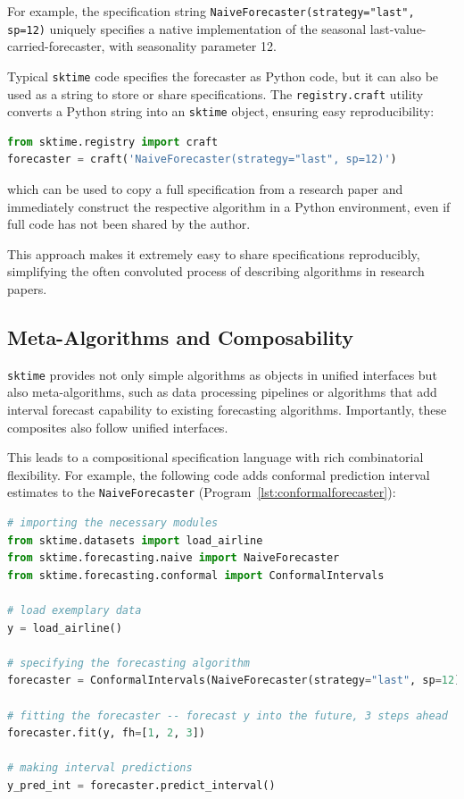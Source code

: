 For example, the specification string
\texttt{NaiveForecaster(strategy="last", sp=12)}
uniquely specifies a native implementation of the seasonal last-value-carried-forecaster, with seasonality parameter 12.

Typical \texttt{sktime} code specifies the forecaster as Python code, but it can also be used as a string to store or share specifications. The \texttt{registry.craft} utility converts a Python string into an \texttt{sktime} object, ensuring easy reproducibility:

\begin{lstlisting}[language=Python, caption=Code to craft a forecaster from a string]
from sktime.registry import craft
forecaster = craft('NaiveForecaster(strategy="last", sp=12)')
\end{lstlisting}
which can be used to copy a full specification from a research paper and immediately construct the respective algorithm in a Python environment, even if full code has not been shared by the author.

This approach makes it extremely easy to share specifications reproducibly, simplifying the often convoluted process of describing algorithms in research papers.

\subsection{Meta-Algorithms and Composability}
\texttt{sktime} provides not only simple algorithms as objects in unified interfaces but also meta-algorithms, such as data processing pipelines or algorithms that add interval forecast capability to existing forecasting algorithms. Importantly, these composites also follow unified interfaces.

This leads to a compositional specification language with rich combinatorial flexibility. For example, the following code adds conformal prediction interval estimates to the \texttt{NaiveForecaster} (Program~\ref{lst:conformalforecaster}):

\begin{lstlisting}[language=Python, caption=Code to add conformal prediction intervals to a forecaster, label=lst:conformalforecaster]
# importing the necessary modules
from sktime.datasets import load_airline
from sktime.forecasting.naive import NaiveForecaster
from sktime.forecasting.conformal import ConformalIntervals

# load exemplary data
y = load_airline()

# specifying the forecasting algorithm
forecaster = ConformalIntervals(NaiveForecaster(strategy="last", sp=12))

# fitting the forecaster -- forecast y into the future, 3 steps ahead
forecaster.fit(y, fh=[1, 2, 3])

# making interval predictions
y_pred_int = forecaster.predict_interval()
\end{lstlisting}

